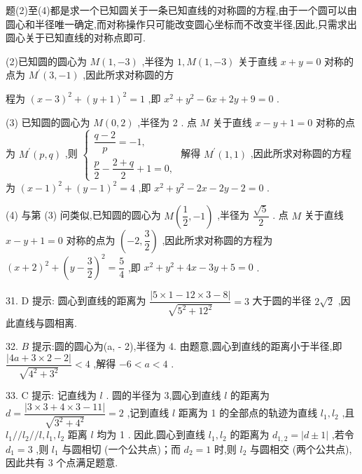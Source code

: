 题(2)至(4)都是求一个已知圆关于一条已知直线的对称圆的方程,由于一个圆可以由圆心和半径唯一确定,而对称操作只可能改变圆心坐标而不改变半径,因此,只需求出圆心关于已知直线的对称点即可.

(2)已知圆的圆心为 $M\left( {1, - 3}\right)$ ,半径为 $1,M\left( {1, - 3}\right)$ 关于直线 $x + y = 0$ 对称的点为 ${M}^{\prime }\left( {3, - 1}\right)$ ,因此所求对称圆的方

程为 ${\left( x - 3\right) }^{2} + {\left( y + 1\right) }^{2} = 1$ ,即 ${x}^{2} + {y}^{2} - {6x} + {2y} + 9 = 0$ .

(3) 已知圆的圆心为 $M\left( {0,2}\right)$ ,半径为 2 . 点 $M$ 关于直线 $x - y + 1 = 0$ 对称的点为 ${M}^{\prime }\left( {p,q}\right)$ ,则 $\left\{  \begin{array}{l} \dfrac{q - 2}{p} =  - 1, \\  \dfrac{p}{2} - \dfrac{2 + q}{2} + 1 = 0, \end{array}\right.$ 解得 ${M}^{\prime }\left( {1,1}\right)$ ,因此所求对称圆的方程为 ${\left( x - 1\right) }^{2} + {\left( y - 1\right) }^{2} = 4$ ,即 ${x}^{2} + {y}^{2} - {2x} - {2y} - 2 = 0$ .

(4) 与第 (3) 问类似,已知圆的圆心为 $M\left( {\dfrac{1}{2}, - 1}\right)$ ,半径为 $\dfrac{\sqrt{5}}{2}$ . 点 $M$ 关于直线 $x - y + 1 = 0$ 对称的点为 $\left( {-2,\dfrac{3}{2}}\right)$ ,因此所求对称圆的方程为 ${\left( x + 2\right) }^{2} + {\left( y - \dfrac{3}{2}\right) }^{2} = \dfrac{5}{4}$ ,即 ${x}^{2} + {y}^{2} + {4x} - {3y} + 5 = 0$ .

31. D 提示: 圆心到直线的距离为 $\dfrac{\left| 5 \times  1 - {12} \times  3 - 8\right| }{\sqrt{{5}^{2} + {12}^{2}}} = 3$ 大于圆的半径 $2\sqrt{2}$ ,因此直线与圆相离.

32. $B$ 提示:圆的圆心为(a, - 2),半径为 4. 由题意,圆心到直线的距离小于半径,即 $\dfrac{\left| 4a + 3 \times  2 - 2\right| }{\sqrt{{4}^{2} + {3}^{2}}} < 4$ ,解得 $- 6 < a < 4$ .

33. C 提示: 记直线为 $l$ . 圆的半径为 3,圆心到直线 $l$ 的距离为 $d = \dfrac{\left| 3 \times  3 + 4 \times  3 - {11}\right| }{\sqrt{{3}^{2} + {4}^{2}}} = 2$ ,记到直线 $l$ 距离为 1 的全部点的轨迹为直线 ${l}_{1},{l}_{2}$ ,且 ${l}_{1}//{l}_{2}//l,{l}_{1},{l}_{2}$ 距离 $l$ 均为 1 . 因此,圆心到直线 ${l}_{1},{l}_{2}$ 的距离为 ${d}_{1,2} = \left| {d \pm  1}\right|$ ,若令 ${d}_{1} = 3$ ,则 ${l}_{1}$ 与圆相切 (一个公共点)；而 ${d}_{2} = 1$ 时,则 ${l}_{2}$ 与圆相交 (两个公共点),因此共有 3 个点满足题意.


